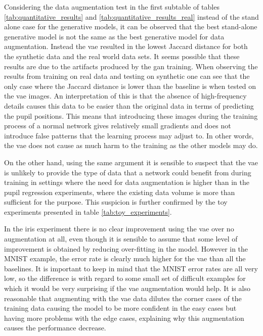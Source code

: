 Considering the data augmentation test in the first subtable of tables \ref{tab:quantitative_results} and \ref{tab:quantitative_results_real} instead of the stand alone case for the generative models, it can be observed that the best stand-alone generative model is not the same as the best generative model for data augmentation. Instead the \acrshort{vae} resulted in the lowest Jaccard distance for both the synthetic data and the real world data sets. It seems possible that these results are due to the artifacts produced by the \acrshort{gan} training. When observing the results from training on real data and testing on synthetic one can see that the only case where the Jaccard distance is lower than the baseline is when tested on the \acrshort{vae} images. An interpretation of this is that the absence of high-frequency details causes this data to be easier than the original data in terms of predicting the pupil positions. This means that introducing these images during the training process of a normal network gives relatively small gradients and does not introduce false patterns that the learning process may adjust to. In other words, the \acrshort{vae} does not cause as much harm to the training as the other models may do. 

On the other hand, using the same argument it is sensible to suspect that the \acrshort{vae} is unlikely to provide the type of data that a network could benefit from during training in settings where the need for data augmentation is higher than in the pupil regression experiments, where the existing data volume is more than sufficient for the purpose. This suspicion is further confirmed by the toy experiments presented in table \ref{tab:toy_experiments}. 

In the iris experiment there is no clear improvement using the \acrshort{vae} over no augmentation at all, even though it is sensible to assume that some level of improvement is obtained by reducing over-fitting in the model. However in the MNIST example, the error rate is clearly much higher for the \acrshort{vae} than all the baselines. It is important to keep in mind that the MNIST error rates are all very low, so the difference is with regard to some small set of difficult examples for which it would be very surprising if the \acrshort{vae} augmentation would help. It is also reasonable that augmenting with the \acrshort{vae} data dilutes the corner cases of the training data causing the model to be more confident in the easy cases but having more problems with the edge cases, explaining why this augmentation causes the performance decrease.

